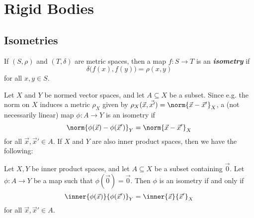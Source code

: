 \documentclass[article, a4paper, 11pt, oneside]{memoir}
\numberwithin{equation}{chapter}
\begin{document}
\newcommand{\keyword}[1]{\textit{\textbf{#1}}}

\addtocounter{chapter}{4}
\chapter{Rigid Bodies}

\section*{Isometries}

If $(S,\rho)$ and $(T,\delta)$ are metric spaces, then a map $f \colon S \to T$ is an \keyword{isometry} if
%
\begin{equation*}
    \delta \bigl( f(x), f(y) \bigr)
        = \rho(x,y)
\end{equation*}
%
for all $x,y \in S$.

Let $X$ and $Y$ be normed vector spaces, and let $A \subseteq X$ be a subset. Since e.g. the norm on $X$ induces a metric $\rho_X$ given by $\rho_X(\vec{x},\vec{x'}) = \norm{\vec{x}-\vec{x}'}_X$, a (not necessarily linear) map $\phi \colon A \to Y$ is an isometry if
%
\begin{equation*}
    \norm{\phi(\vec{x}) - \phi(\vec{x}')}_Y
        = \norm{\vec{x} - \vec{x}'}_X
\end{equation*}
%
for all $\vec{x}, \vec{x}' \in A$. If $X$ and $Y$ are also inner product spaces, then we have the following:

\begin{lemma}
    \label{lem:isometry-preserves-inner-product}
    Let $X,Y$ be inner product spaces, and let $A \subseteq X$ be a subset containing $\vec{0}$. Let $\phi \colon A \to Y$ be a map such that $\phi(\vec{0}) = \vec{0}$. Then $\phi$ is an isometry if and only if
    \begin{equation}
        \label{eq:isometry-inner-product}
        \inner{\phi(\vec{x})}{\phi(\vec{x}')}_Y
            = \inner{\vec{x}}{\vec{x}'}_X
    \end{equation}
    for all $\vec{x}, \vec{x}' \in A$.
\end{lemma}
\end{document}
